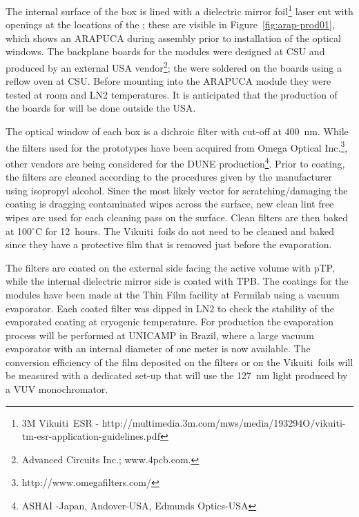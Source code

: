 The internal surface of the box is lined with a dielectric mirror foil\footnote{3M Vikuiti\texttrademark\  ESR - http://multimedia.3m.com/mws/media/193294O/vikuiti-tm-esr-application-guidelines.pdf} laser cut with openings at the locations of the ; these are visible in Figure~\ref{fig:arap-prod01}, which shows an ARAPUCA during assembly prior to installation of the optical windows. The backplane  boards for the  modules were designed at CSU and produced by an external USA vendor\footnote{Advanced Circuits Inc.; www.4pcb.com.}; the  were soldered on the boards using a reflow oven at CSU. Before mounting into the ARAPUCA module they were tested at room and LN2 temperatures. It is anticipated that the production of the boards for   will be done outside the USA. %

The optical window of each box is a dichroic filter with cut-off at \SI{400}{nm}. While the filters used for the  prototypes have been acquired from Omega Optical Inc.\footnote{http://www.omegafilters.com/}, other vendors are being considered for the DUNE production\footnote{ASHAI -Japan, Andover-USA, Edmunds Optics-USA}.
Prior to coating, the filters are cleaned according to the procedures given by the manufacturer using isopropyl alcohol. Since the most likely vector for scratching/damaging the coating is dragging contaminated wipes across the surface, new clean lint free wipes are used for each  cleaning pass on the surface. Clean filters are then baked at 100$^\circ$C for \SI{12}{hours}. The Vikuiti\texttrademark\  foils do not need to be cleaned and baked since they have a protective film that is removed just before the evaporation.
   
The filters are coated on the external side facing the \lar active volume with pTP,
while the internal dielectric mirror side is coated with TPB.
The coatings for the  modules have been made at the Thin Film facility at Fermilab using a vacuum evaporator. Each coated filter was dipped in LN2 to check the stability of the evaporated coating at cryogenic temperature. For   production the evaporation process will be performed at UNICAMP in Brazil, where a large vacuum evaporator with an internal diameter of one meter is now available. The  conversion efficiency of the film deposited on the filters or on the Vikuiti\texttrademark\   foils will be measured with a dedicated set-up that will use the \SI{127}{nm} light produced by a VUV monochromator.


